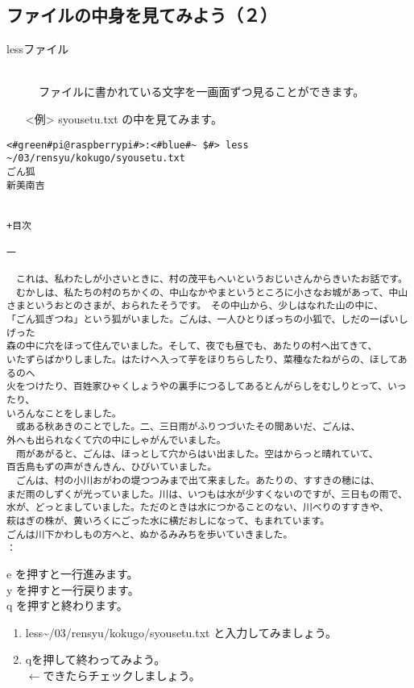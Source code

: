 \subsection{ファイルの中身を見てみよう（２）}
\begin{description}
\item[less\textvisiblespace ファイル]\mbox{}\\
ファイルに書かれている文字を一画面ずつ見ることができます。
\end{description}
\begin{itemize}
\item[<例>]syousetu.txt の中を見てみます。
\end{itemize}
\begin{lstlisting}[caption=lessの例, label=less]
<#green#pi@raspberrypi#>:<#blue#~ $#> less ~/03/rensyu/kokugo/syousetu.txt
ごん狐
新美南吉


+目次

一

　これは、私わたしが小さいときに、村の茂平もへいというおじいさんからきいたお話です。
　むかしは、私たちの村のちかくの、中山なかやまというところに小さなお城があって、中山
さまというおとのさまが、おられたそうです。　その中山から、少しはなれた山の中に、
「ごん狐ぎつね」という狐がいました。ごんは、一人ひとりぼっちの小狐で、しだの一ぱいしげった
森の中に穴をほって住んでいました。そして、夜でも昼でも、あたりの村へ出てきて、
いたずらばかりしました。はたけへ入って芋をほりちらしたり、菜種なたねがらの、ほしてあるのへ
火をつけたり、百姓家ひゃくしょうやの裏手につるしてあるとんがらしをむしりとって、いったり、
いろんなことをしました。
　或ある秋あきのことでした。二、三日雨がふりつづいたその間あいだ、ごんは、
外へも出られなくて穴の中にしゃがんでいました。
　雨があがると、ごんは、ほっとして穴からはい出ました。空はからっと晴れていて、
百舌鳥もずの声がきんきん、ひびいていました。
　ごんは、村の小川おがわの堤つつみまで出て来ました。あたりの、すすきの穂には、
まだ雨のしずくが光っていました。川は、いつもは水が少すくないのですが、三日もの雨で、
水が、どっとましていました。ただのときは水につかることのない、川べりのすすきや、
萩はぎの株が、黄いろくにごった水に横だおしになって、もまれています。
ごんは川下かわしもの方へと、ぬかるみみちを歩いていきました。
：
\end{lstlisting}
e を押すと一行進みます。\\
y を押すと一行戻ります。\\
q を押すと終わります。\\
\begin{tcolorbox}[title=\useOmetoi]
\begin{enumerate}
\item less\textvisiblespace \textasciitilde /03/rensyu/kokugo/syousetu.txt と入力してみましょう。\\
\item qを押して終わってみよう。\\
\fbox{\phantom{白}} $\leftarrow$できたらチェックしましょう。
\end{enumerate}
\end{tcolorbox}